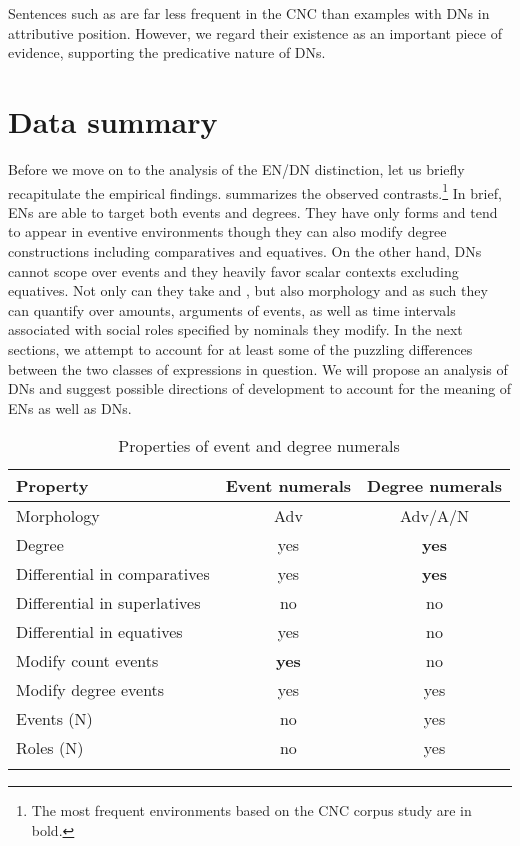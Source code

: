 \documentclass[output=paper,modfonts,hidelinks,newtxmath
\ChapterDOI{10.5281/zenodo.2545513}
]{langscibook}
\begin{document}
\noindent Sentences such as  are far less frequent in the CNC than examples with  DNs in attributive position. However, we regard their existence as an important piece of evidence, supporting the predicative nature of DNs.

\section{Data summary}\label{data-summary}

Before we move on to the analysis of the EN/DN distinction, let us briefly recapitulate the empirical findings.  summarizes the observed contrasts.\footnote{The most frequent environments based on the CNC corpus study are in bold.} In brief, ENs are able to target both events and degrees. They have only  forms and tend to appear in eventive environments though they can also modify degree constructions including comparatives and equatives. On the other hand, DNs cannot scope over events and they heavily favor scalar contexts excluding equatives. Not only can they take  and , but also  morphology and as such they can quantify over amounts, arguments of events, as well as time intervals associated with social roles specified by nominals they modify. In the next sections, we attempt to account for at least some of the puzzling differences between the two classes of expressions in question. We will propose an analysis of  DNs and suggest possible directions of development to account for the meaning of ENs as well as  DNs.

\begin{table}[t]
\caption{Properties of event and degree numerals}\label{table:properties}
\begin{tabular}{lcc}
\lsptoprule
Property & Event numerals & Degree numerals\tabularnewline
\midrule
Morphology & Adv & Adv/A/N\tabularnewline
Degree & yes & \textbf{yes}\tabularnewline
Differential in comparatives & yes & \textbf{yes}\tabularnewline
Differential in superlatives & no & no\tabularnewline
Differential in equatives & yes & no\tabularnewline
Modify count events & \textbf{yes} & no\tabularnewline
Modify degree events & yes & yes\tabularnewline
Events (N) & no & yes\tabularnewline
Roles (N) & no & yes\tabularnewline
\lspbottomrule
\end{tabular}
\end{table}
\end{document}
